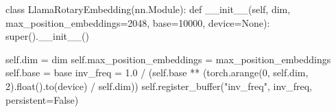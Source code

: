 \documentclass[
]{report}
\newenvironment{Shaded}{\begin{snugshade}}{\end{snugshade}}
\newcommand{\BuiltInTok}[1]{\textcolor[rgb]{0.00,0.23,0.31}{#1}}
\newcommand{\DecValTok}[1]{\textcolor[rgb]{0.68,0.00,0.00}{#1}}
\newcommand{\FloatTok}[1]{\textcolor[rgb]{0.68,0.00,0.00}{#1}}
\newcommand{\FunctionTok}[1]{\textcolor[rgb]{0.28,0.35,0.67}{#1}}
\newcommand{\KeywordTok}[1]{\textcolor[rgb]{0.00,0.23,0.31}{#1}}
\newcommand{\NormalTok}[1]{\textcolor[rgb]{0.00,0.23,0.31}{#1}}
\newcommand{\OperatorTok}[1]{\textcolor[rgb]{0.37,0.37,0.37}{#1}}
\newcommand{\StringTok}[1]{\textcolor[rgb]{0.13,0.47,0.30}{#1}}
\newcommand{\VariableTok}[1]{\textcolor[rgb]{0.07,0.07,0.07}{#1}}
\begin{document}
\begin{Shaded}
\begin{Highlighting}[]
\KeywordTok{class}\NormalTok{ LlamaRotaryEmbedding(nn.Module):}
    \KeywordTok{def} \FunctionTok{\_\_init\_\_}\NormalTok{(}\VariableTok{self}\NormalTok{, dim, max\_position\_embeddings}\OperatorTok{=}\DecValTok{2048}\NormalTok{, base}\OperatorTok{=}\DecValTok{10000}\NormalTok{, device}\OperatorTok{=}\VariableTok{None}\NormalTok{):}
        \BuiltInTok{super}\NormalTok{().}\FunctionTok{\_\_init\_\_}\NormalTok{()}

        \VariableTok{self}\NormalTok{.dim }\OperatorTok{=}\NormalTok{ dim}
        \VariableTok{self}\NormalTok{.max\_position\_embeddings }\OperatorTok{=}\NormalTok{ max\_position\_embeddings}
        \VariableTok{self}\NormalTok{.base }\OperatorTok{=}\NormalTok{ base}
\NormalTok{        inv\_freq }\OperatorTok{=} \FloatTok{1.0} \OperatorTok{/}\NormalTok{ (}\VariableTok{self}\NormalTok{.base }\OperatorTok{**}\NormalTok{ (torch.arange(}\DecValTok{0}\NormalTok{, }\VariableTok{self}\NormalTok{.dim, }\DecValTok{2}\NormalTok{).}\BuiltInTok{float}\NormalTok{().to(device) }\OperatorTok{/} \VariableTok{self}\NormalTok{.dim))}
        \VariableTok{self}\NormalTok{.register\_buffer(}\StringTok{"inv\_freq"}\NormalTok{, inv\_freq, persistent}\OperatorTok{=}\VariableTok{False}\NormalTok{)}
\end{Highlighting}
\end{Shaded}
\end{document}
